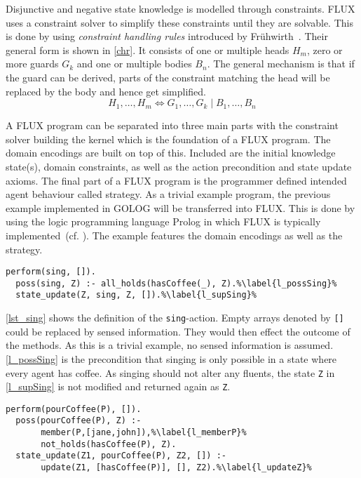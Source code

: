 Disjunctive and negative state knowledge is modelled through constraints. FLUX uses a constraint solver to simplify these constraints until they are solvable. This is done by using \emph{constraint handling rules} introduced by Frühwirth~\cite{fruhwirth_theory_1998}. Their general form is shown in \autoref{chr}. It consists of one or multiple heads $H_m$, zero or more guards $G_k$ and one or multiple bodies $B_n$. The general mechanism is that if the guard can be derived, parts of the constraint matching the head will be replaced by the body and hence get simplified.
\begin{equation}\label{chr}
  H_1,\ldots,H_m\Leftrightarrow G_1,\ldots,G_k \mid B_1,\ldots,B_n
\end{equation}

A FLUX program can be separated into three main parts with the constraint solver building the kernel which is the foundation of a FLUX program. The domain encodings are built on top of this. Included are the initial knowledge state(s), domain constraints, as well as the action precondition and state update axioms. The final part of a FLUX program is the programmer defined intended agent behaviour called strategy. As a trivial example program, the previous example implemented in GOLOG will be transferred into FLUX. This is done by using the logic programming language Prolog in which FLUX is typically implemented~(cf. \cite{thielscher_reasoning_2006,martin_addressing_2001}). %
The example features the domain encodings as well as the strategy.
\begin{lstlisting}[caption={Defintion of the \texttt{sing}-action.}, label=lst_sing]
  perform(sing, []).
  poss(sing, Z) :- all_holds(hasCoffee(_), Z).%\label{l_possSing}%
  state_update(Z, sing, Z, []).%\label{l_supSing}%
\end{lstlisting}
\autoref{lst_sing} shows the definition of the \texttt{sing}-action. Empty arrays denoted by \texttt{[]} could be replaced by sensed information. They would then effect the outcome of the methods. As this is a trivial example, no sensed information is assumed. \autoref{l_possSing} is the precondition that singing is only possible in a state where every agent has coffee. As singing should not alter any fluents, the state \texttt{Z} in \autoref{l_supSing} is not modified and returned again as \texttt{Z}.
\begin{lstlisting}[firstnumber=4, caption={Definition of the \texttt{pourCoffee}-action}, label=lst_pourCoffee]
  perform(pourCoffee(P), []).
  poss(pourCoffee(P), Z) :-
       member(P,[jane,john]),%\label{l_memberP}%
       not_holds(hasCoffee(P), Z).
  state_update(Z1, pourCoffee(P), Z2, []) :-
       update(Z1, [hasCoffee(P)], [], Z2).%\label{l_updateZ}%
\end{lstlisting}
